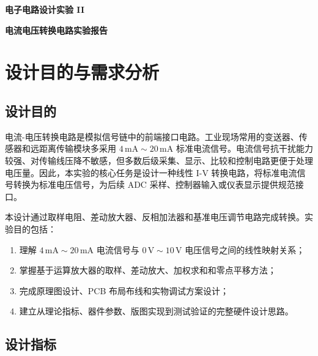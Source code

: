 \documentclass[UTF8,a4paper,zihao=-4]{ctexart}
\begin{document}
\noindent\begin{minipage}[c][150pt][c]{\textwidth}
  {\Large\bfseries 电子电路设计实验 II\par}
  \vspace{14pt}
  {\LARGE\bfseries 电流电压转换电路实验报告\par}
\end{minipage}\par

\tableofcontents
\newpage

\section{设计目的与需求分析}

\subsection{设计目的}

电流-电压转换电路是模拟信号链中的前端接口电路。工业现场常用的变送器、传感器和远距离传输模块多采用 $4\,\mathrm{mA}\sim20\,\mathrm{mA}$ 标准电流信号。电流信号抗干扰能力较强、对传输线压降不敏感，但多数后级采集、显示、比较和控制电路更便于处理电压量。因此，本实验的核心任务是设计一种线性 I-V 转换电路，将标准电流信号转换为标准电压信号，为后续 ADC 采样、控制器输入或仪表显示提供规范接口。

本设计通过取样电阻、差动放大器、反相加法器和基准电压调节电路完成转换。实验目的包括：
\begin{enumerate}
  \item 理解 $4\,\mathrm{mA}\sim20\,\mathrm{mA}$ 电流信号与 $0\,\mathrm{V}\sim10\,\mathrm{V}$ 电压信号之间的线性映射关系；
  \item 掌握基于运算放大器的取样、差动放大、加权求和和零点平移方法；
  \item 完成原理图设计、PCB 布局布线和实物调试方案设计；
  \item 建立从理论指标、器件参数、版图实现到测试验证的完整硬件设计思路。
\end{enumerate}

\subsection{设计指标}
\end{document}
